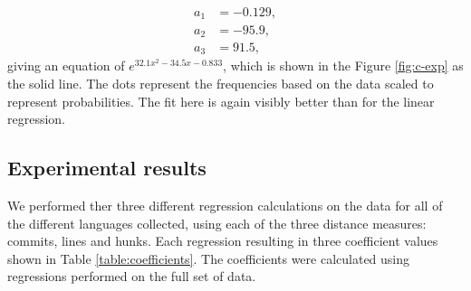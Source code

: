 \documentclass[10pt,journal,compsoc]{IEEEtran}
\begin{document}
\begin{align*}
a_1 & = -0.129, \\
a_2 & = -95.9, \\
a_3 & = 91.5,
\end{align*}
giving an equation of $e^{32.1x^{2} - 34.5x - 0.833}$, which is shown in the Figure \ref{fig:c-exp} as the solid line. The dots represent the frequencies based on the data scaled to represent probabilities. The fit here is again visibly better than for the linear regression.

\subsection{Experimental results}

We performed ther three different regression calculations on the data for all of the different languages collected, using each of the three distance measures: commits, lines and hunks. Each regression resulting in three coefficient values shown in Table \ref{table:coefficients}. The coefficients were calculated using regressions performed on the full set of data.
\end{document}

